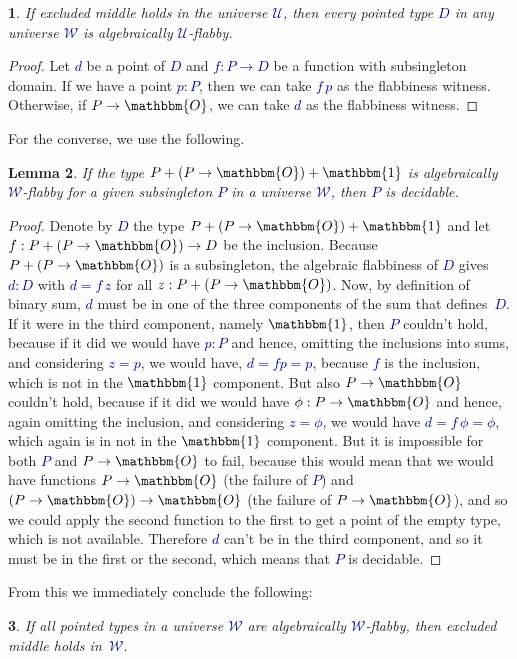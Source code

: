 \documentclass[10pt]{article}
\newcommand{\db}{\textcolor{darkblue}}
\newcommand{\m}[1]{\db{$#1$}}
\newcommand{\U}{\mathcal{U}}
\newcommand{\W}{\mathcal{W}}
\newcommand{\Zero}{\mathbbm{O}}
\newcommand{\One}{\mathbbm{1}}
\newtheorem{numbered}{}
\newtheorem{lemma}[numbered]{Lemma}
\theoremstyle{definition}
\begin{document}
\begin{numbered}
  If excluded middle holds in the universe \m{\U}, then every pointed
  type \m{D} in any universe \m{\W} is algebraically \m{\U}-flabby.
\end{numbered}
\begin{proof}
  Let \m{d} be a point of \m{D} and \m{f : P \to D} be a function with
  subsingleton domain. If we have a point \m{p : P}, then we can take
  \m{f \, p} as the flabbiness witness. Otherwise, if \m{P \to \Zero},
  we can take \m{d} as the flabbiness witness.
\end{proof}
\noindent
For the converse, we use the following.
\begin{lemma}
  If the type \m{P + (P \to \Zero) + \One} is algebraically
  \m{\W}-flabby for a given subsingleton \m{P} in a universe \m{\W},
  then \m{P} is decidable.
\end{lemma}
\begin{proof}
  Denote by \m{D} the type \m{P + (P \to \Zero) + \One} and let \m{f :
    P + (P \to \Zero) \to D} be the inclusion. Because \m{P + (P \to
    \Zero)} is a subsingleton, the algebraic flabbiness of \m{D} gives
  \m{d : D} with \m{d = f \, z} for all \m{z : P + (P \to \Zero)}.
  Now, by definition of binary sum, \m{d} must be in one of the three
  components of the sum that defines~\m{D}.  If it were in the third
  component, namely \m{\One}, then \m{P} couldn't hold, because if it
  did we would have \m{p:P} and hence, omitting the inclusions into
  sums, and considering \m{z=p}, we would have, \m{d = f p = p},
  because \m{f} is the inclusion, which is not in the \m{\One}
  component. But also \m{P \to \Zero} couldn't hold, because if it did
  we would have \m{\phi:P \to \Zero} and hence, again omitting the
  inclusion, and considering \m{z=\phi}, we would have \m{d = f \,
    \phi = \phi}, which again is in not in the \m{\One} component. But
  it is impossible for both \m{P} and \m{P \to \Zero} to fail, because
  this would mean that we would have functions \m{P \to \Zero} (the
  failure of \m{P}) and \m{(P \to \Zero) \to \Zero} (the failure of
  \m{P \to \Zero}), and so we could apply the second function to the
  first to get a point of the empty type, which is not
  available. Therefore \m{d} can't be in the third component, and so
  it must be in the first or the second, which means that \m{P} is
  decidable.
\end{proof}
\noindent From this we immediately conclude the following:
\begin{numbered}
  If all pointed types in a universe \m{\W} are algebraically \m{\W}-flabby, then excluded middle holds in~\m{\W}.
\end{numbered}
\end{document}
